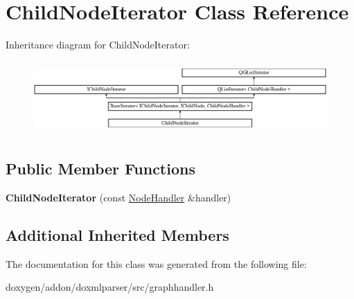 \hypertarget{class_child_node_iterator}{}\section{Child\+Node\+Iterator Class Reference}
\label{class_child_node_iterator}
Inheritance diagram for Child\+Node\+Iterator\+:\begin{figure}[H]
\begin{center}
\leavevmode
\includegraphics[height=2.814070cm]{class_child_node_iterator}
\end{center}
\end{figure}
\subsection*{Public Member Functions}
\begin{DoxyCompactItemize}
\item 
\mbox{\label{class_child_node_iterator_aae41a4c7cf2ba3f3b4a83d804d82f3d0}} 
{\bfseries Child\+Node\+Iterator} (const \mbox{\hyperlink{class_node_handler}{Node\+Handler}} \&handler)
\end{DoxyCompactItemize}
\subsection*{Additional Inherited Members}


The documentation for this class was generated from the following file\+:\begin{DoxyCompactItemize}
\item 
doxygen/addon/doxmlparser/src/graphhandler.\+h\end{DoxyCompactItemize}
